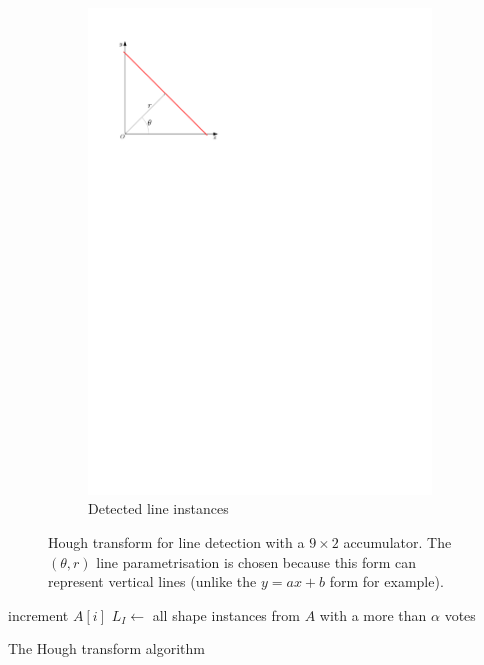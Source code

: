 \begin{figure}[htb]
\begin{subfigure}[b]{0.3\linewidth}
		\includegraphics[width=\textwidth,page=4]{figs/hough-transform.pdf}
		\caption{Detected line instances}
		\label{fig:hough-transform:e}
	\end{subfigure}
	\caption{Hough transform for line detection with a $9\times2$ accumulator. The $(\theta,r)$ line parametrisation is chosen because this form can represent vertical lines (unlike the $y=ax+b$ form for example).}
	\label{fig:hough-transform}
\end{figure}
\begin{algorithm} 
	
	 {
		{
			increment $A[i]$\;
		}
	}
	$L_I \leftarrow$ all shape instances from $A$ with a more than $\alpha$ votes\;
	\caption{The Hough transform algorithm}
	\label{algo:hough-transform}
\end{algorithm}

